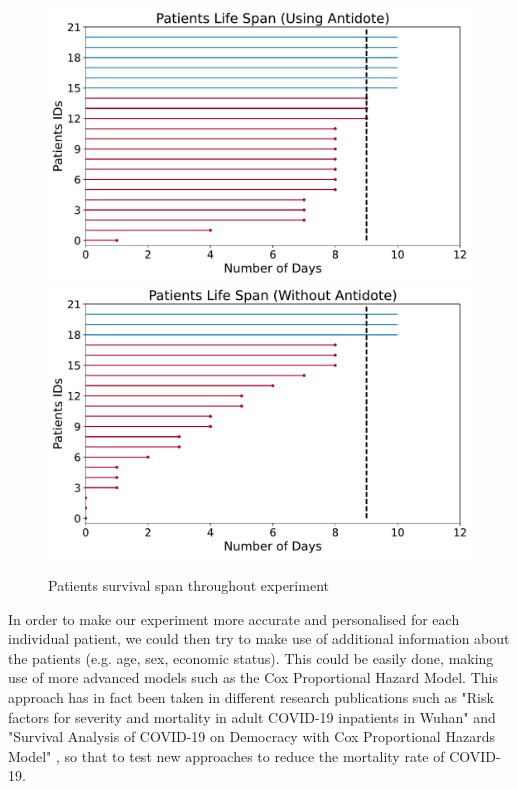 \begin{figure}[ht!]%
    \centering
    \includegraphics[width=0.5\linewidth]{latex/images/survival_span.pdf}
    \includegraphics[width=0.49\linewidth]{latex/images/survival_span2.pdf}
    \vspace{-0.2cm}
    \caption{Patients survival span throughout experiment}
    \label{span}
\end{figure}

In order to make our experiment more accurate and personalised for each individual patient, we could then try to make use of additional information about the patients (e.g. age, sex, economic status). This could be easily done, making use of more advanced models such as the Cox Proportional Hazard Model. This approach has in fact been taken in different research publications such as "Risk factors for severity and mortality in adult COVID-19 inpatients in Wuhan" \cite{surv1} and "Survival Analysis of COVID-19 on Democracy with Cox Proportional Hazards Model" \cite{surv2}, so that to test new approaches to reduce the mortality rate of COVID-19. 